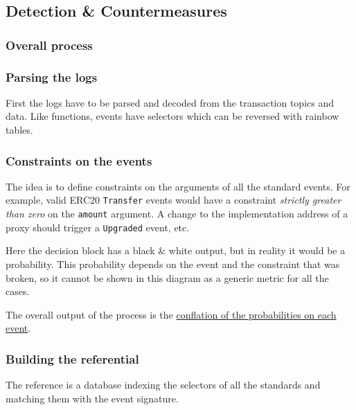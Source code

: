 \pagebreak
\subsection{Detection \& Countermeasures}

\subsubsection{Overall process}

\hspace*{-2cm}


\subsubsection{Parsing the logs}

First the logs have to be parsed and decoded from the transaction topics and data.
Like functions, events have selectors which can be reversed with rainbow tables.

\subsubsection{Constraints on the events}

The idea is to define constraints on the arguments of all the standard events.
For example, valid ERC20 \lstinline{Transfer} events would have a constraint \emph{strictly greater than zero} on the \lstinline{amount} argument.
A change to the implementation address of a proxy should trigger a \lstinline{Upgraded} event, etc.

Here the decision block has a black \& white output, but in reality it would be a probability.
This probability depends on the event and the constraint that was broken, so it cannot be shown in this diagram as a generic metric for all the cases.

The overall output of the process is the \href{https://www.ams.org/journals/tran/2011-363-06/S0002-9947-2011-05340-7/S0002-9947-2011-05340-7.pdf}{conflation of the probabilities on each event}.

\subsubsection{Building the referential}

The reference is a database indexing the selectors of all the standards and matching them with the event signature.
